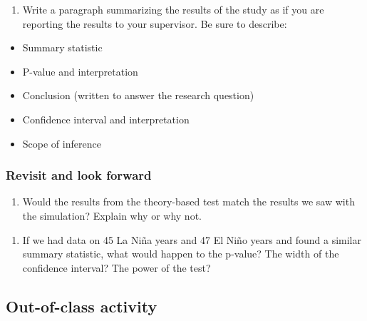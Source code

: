 \documentclass[
]{report}
\providecommand{\tightlist}{%
  \setlength{\itemsep}{0pt}\setlength{\parskip}{0pt}}
\newcommand\latexcode[1]{#1}
\begin{document}
\begin{enumerate}
\def\labelenumi{\arabic{enumi}.}
\setcounter{enumi}{19}
\tightlist
\item
  Write a paragraph summarizing the results of the study as if you are reporting the results to your supervisor. Be sure to describe:
\end{enumerate}

\begin{itemize}
\item
  Summary statistic
\item
  P-value and interpretation
\item
  Conclusion (written to answer the research question)
\item
  Confidence interval and interpretation
\item
  Scope of inference
\end{itemize}

\vspace{3in}

\hypertarget{revisit-and-look-forward-3}{%
\subsubsection*{Revisit and look forward}\label{revisit-and-look-forward-3}}

\begin{enumerate}
\def\labelenumi{\arabic{enumi}.}
\setcounter{enumi}{20}
\tightlist
\item
  Would the results from the theory-based test match the results we saw with the simulation? Explain why or why not.
\end{enumerate}

\vspace{1in}

\begin{enumerate}
\def\labelenumi{\arabic{enumi}.}
\setcounter{enumi}{21}
\tightlist
\item
  If we had data on 45 La Ni\latexcode{\~{n}}a years and 47 El Ni\latexcode{\~{n}}o years and found a similar summary statistic, what would happen to the p-value? The width of the confidence interval? The power of the test?
\end{enumerate}

\vspace{1in}

\hypertarget{out-of-class-activity-10}{%
\subsection{Out-of-class activity}\label{out-of-class-activity-10}}
\end{document}

